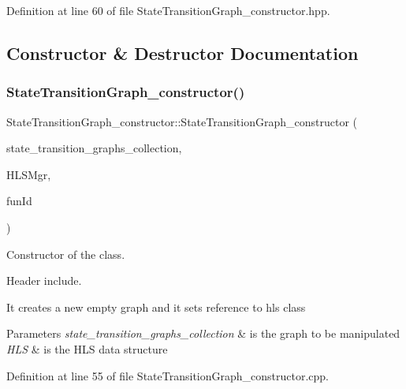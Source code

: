 Definition at line 60 of file State\+Transition\+Graph\+\_\+constructor.\+hpp.



\subsection{Constructor \& Destructor Documentation}
\mbox{\label{classStateTransitionGraph__constructor_a30dedfe3edca3f9d0c9250d5fa367f71}} 
\subsubsection{\texorpdfstring{State\+Transition\+Graph\+\_\+constructor()}{StateTransitionGraph\_constructor()}}
{\footnotesize\ttfamily State\+Transition\+Graph\+\_\+constructor\+::\+State\+Transition\+Graph\+\_\+constructor (\begin{DoxyParamCaption}\item[{const \hyperlink{state__transition__graph_8hpp_a2613a37dfdde13c61d36bfaba91f433e}{State\+Transition\+Graphs\+Collection\+Ref}}]{state\+\_\+transition\+\_\+graphs\+\_\+collection,  }\item[{const \hyperlink{hls__manager_8hpp_a1b481383e3beabc89bd7562ae672dd8c}{H\+L\+S\+\_\+manager\+Const\+Ref}}]{H\+L\+S\+Mgr,  }\item[{unsigned int}]{fun\+Id }\end{DoxyParamCaption})}



Constructor of the class. 

Header include.

It creates a new empty graph and it sets reference to hls class 
\begin{DoxyParams}{Parameters}
{\em state\+\_\+transition\+\_\+graphs\+\_\+collection} & is the graph to be manipulated \\
\hline
{\em H\+LS} & is the H\+LS data structure \\
\hline
\end{DoxyParams}


Definition at line 55 of file State\+Transition\+Graph\+\_\+constructor.\+cpp.



